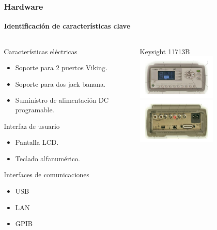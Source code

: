 \documentclass[xcolor=pdftext, table]{beamer}
\begin{document}
	\begin{frame}
		\frametitle{Hardware}
		\framesubtitle{Identificación de características clave}
		
		\begin{columns}
			
			\begin{column}{6cm}
				
				\begin{block}{Características eléctricas}					
					\begin{itemize}
						\tiny
						\item Soporte para 2 puertos Viking.
						\item Soporte para dos jack banana.
						\item Suministro de alimentación DC programable.
					\end{itemize}
				\end{block}		
			
				\begin{block}{Interfaz de usuario}				
					\begin{itemize}
						\tiny
						\item Pantalla LCD.
						\item Teclado alfanumérico.
					\end{itemize}
				\end{block}			
			
			\begin{block}{Interfaces de comunicaciones}
				\begin{itemize}
					\tiny
					\item USB
					\item LAN
					\item GPIB
				\end{itemize}
			\end{block}							

			\end{column}
		
			\begin{column}{4cm}
				
				\begin{block}{\small Keysight 11713B}
					\includegraphics[width=4cm]{Imagenes/front-11713B.pdf} \\
					\includegraphics[width=4cm]{Imagenes/back-11713B.pdf}
				\end{block}
											
			\end{column}		
		
		\end{columns}
	
	\end{frame}
\end{document}
